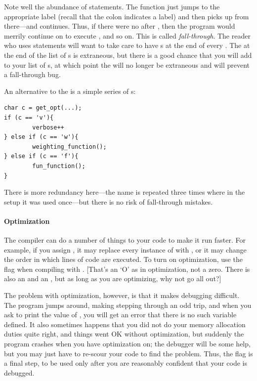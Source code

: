 \documentclass[12pt]{article}
\makeatletter
\def\ind#1{\index{#1}#1}
\def\cind#1{\index{#1@\cinline{#1}}\cinline{#1}}
\makeatother
\begin{document}
Note well the abundance of  statements.  The 
function just jumps to the appropriate label (recall that the colon
indicates a label) and then picks up from there---and continues. Thus,
if there were no  after , then the program
would merrily continue on to execute , and so
on. This is called {\sl fall-through}. The
reader who uses  statements will want to take care
to have s at the end of every .  The 
at the end of the list of s is extraneous, but there is a good
chance that you will add to your list of s, at which point
the  will no longer be extraneous and will prevent a fall-through bug.

An alternative to the  is a simple series of s:
\begin{lstlisting}
char c = get_opt(...);
if (c == 'v'){
        verbose++
} else if (c == 'w'){
        weighting_function();
} else if (c == 'f'){
        fun_function();
}
\end{lstlisting}
There is more redundancy here---the name  is repeated three times
where in the  setup it was used once---but there is no risk
of fall-through mistakes.


\paragraph{Optimization} 
The \cind{gcc} compiler can do a number of things to your code to make it
run faster. For example, if you assign , it may replace
every instance of  with , or it may change the order
in which lines of code are executed. To turn on \ind{optimization},
use the  flag when compiling with . [That's an `O'
as in optimization, not a zero. There is also an  and an , but as long as you are optimizing, why not go all out?]

The problem with optimization, however, is that it makes debugging
difficult. The program jumps around, making stepping through an odd
trip, and when you ask to print the value of , you will get
an error that there is no such variable defined.
It also sometimes happens that you did not do your memory allocation duties
quite right, and things went OK without optimization, but suddenly the
program crashes when you have optimization on; the debugger will be some
help, but you may just have to re-scour your code to find the problem.
Thus, the  flag is a final step, to be used only after you
are reasonably confident that your code is debugged.
\end{document}
